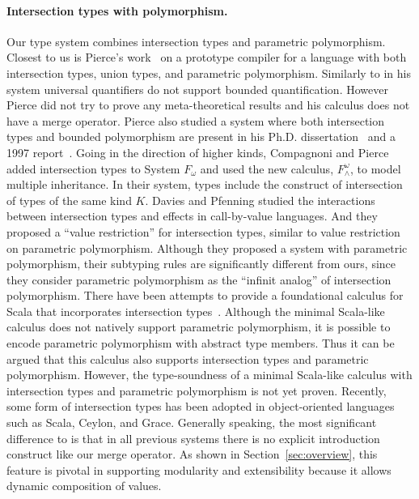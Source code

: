 \paragraph{Intersection types with polymorphism.}
Our type system combines intersection types and parametric polymorphism. Closest
to us is Pierce's work~\cite{pierce1991programming1} on a prototype
compiler for a language with both intersection types, union types, and
parametric polymorphism. Similarly to \name in his system universal
quantifiers do not support bounded quantification. However Pierce did not try to prove any
meta-theoretical results and his calculus does not have a merge
operator.  Pierce also studied a system where both intersection
types and bounded polymorphism are present in his Ph.D.
dissertation~\cite{pierce1991programming2} and a 1997
report~\cite{pierce1997intersection}. Going in the direction of higher
kinds, Compagnoni and Pierce~\cite{compagnoni1996higher} added
intersection types to System $ F_{\omega} $ and used the new calculus,
$ F^{\omega}_{\wedge} $, to model multiple inheritance. In their
system, types include the construct of intersection of types of the
same kind $ K $. Davies and Pfenning
\cite{davies2000intersection} studied the interactions between
intersection types and effects in call-by-value languages. And they
proposed a ``value restriction'' for intersection types, similar to
value restriction on parametric polymorphism. Although they proposed a system with
parametric polymorphism, their subtyping rules are significantly different from ours,
since they consider parametric polymorphism
as the ``infinit analog'' of intersection polymorphism.
There have been attempts to provide a foundational calculus
for Scala that incorporates intersection
types~\cite{amin2014foundations,amin2012dependent}.
Although the minimal Scala-like calculus does not natively support
parametric polymorphism, it is possible to encode parametric
polymorphism with abstract type members. Thus it can be argued that
this calculus also supports intersection types and parametric
polymorphism. However, the type-soundness of a minimal Scala-like
calculus with intersection types and parametric polymorphism is not
yet proven. Recently, some form of intersection
types has been adopted in object-oriented languages such as Scala,
Ceylon, and Grace. Generally speaking,
the most significant difference to \name is that in all previous systems
there is no explicit introduction construct like our merge operator. As shown in
Section~\ref{sec:overview}, this feature is pivotal in supporting modularity
and extensibility because it allows dynamic composition of values.

